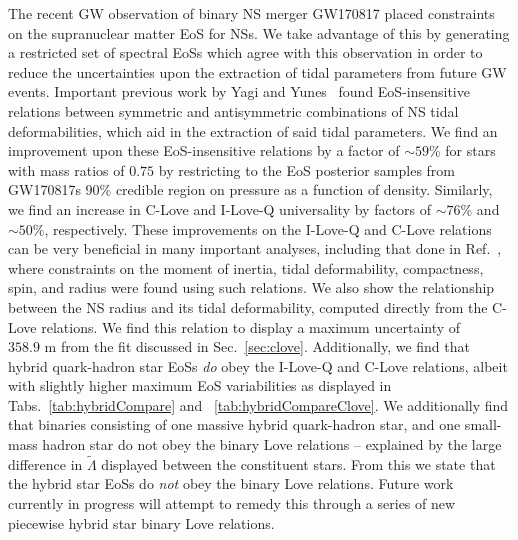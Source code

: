 \documentclass[prd,twocolumn,nofootinbib,superscriptaddress,amsmath,amssymb]{revtex4-1}
\begin{document}
The recent GW observation of binary NS merger GW170817 placed constraints on the supranuclear matter EoS for NSs.
We take advantage of this by generating a restricted set of spectral EoSs which agree with this observation in order to reduce the uncertainties upon the extraction of tidal parameters from future GW events.
Important previous work by Yagi and Yunes~\cite{Yagi:ILQ,Yagi:binLove} found EoS-insensitive relations between symmetric and antisymmetric combinations of NS tidal deformabilities, which aid in the extraction of said tidal parameters.
We find an improvement upon these EoS-insensitive relations by a factor of $\sim 59$\% for stars with mass ratios of $0.75$ by restricting to the EoS posterior samples from GW170817s 90\% credible region on pressure as a function of density.
Similarly, we find an increase in C-Love and I-Love-Q universality by factors of $\sim 76$\% and $\sim 50$\%, respectively.
These improvements on the I-Love-Q and C-Love relations can be very beneficial in many important analyses, including that done in Ref.~\cite{Kumar:2019xgp}, where constraints on the moment of inertia, tidal deformability, compactness, spin, and radius were found using such relations.
We also show the relationship between the NS radius and its tidal deformability, computed directly from the C-Love relations.
We find this relation to display a maximum uncertainty of $358.9\text{ m}$ from the fit discussed in Sec.~\ref{sec:clove}.
Additionally, we find that hybrid quark-hadron star EoSs \emph{do} obey the I-Love-Q and C-Love relations, albeit with slightly higher maximum EoS variabilities as displayed in Tabs.~\ref{tab:hybridCompare} and ~\ref{tab:hybridCompareClove}.
We additionally find that binaries consisting of one massive hybrid quark-hadron star, and one small-mass hadron star do not obey the binary Love relations -- explained by the large difference in $\tilde{\Lambda}$ displayed between the constituent stars.
From this we state that the hybrid star EoSs do \emph{not} obey the binary Love relations.
Future work currently in progress will attempt to remedy this through a series of new piecewise hybrid star binary Love relations.
\end{document}
